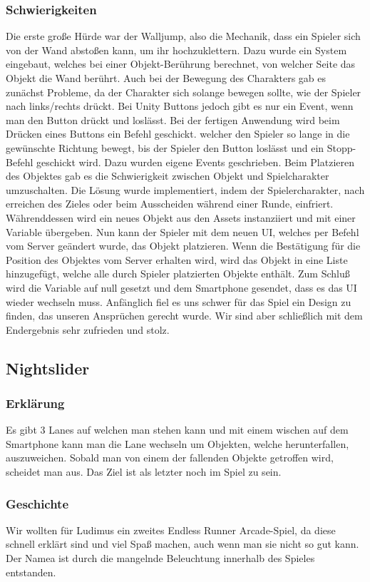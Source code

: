\subsubsection{Schwierigkeiten}
Die erste große Hürde war der Walljump, also die Mechanik, dass ein Spieler sich von der Wand abstoßen kann, um ihr hochzuklettern. Dazu wurde ein System eingebaut, welches bei einer Objekt-Berührung berechnet, von welcher Seite das Objekt die Wand berührt. Auch bei der Bewegung des Charakters gab es zunächst Probleme, da der Charakter sich solange bewegen sollte, wie der Spieler nach links/rechts drückt. Bei Unity Buttons jedoch gibt es nur ein Event, wenn man den Button drückt und loslässt. Bei der fertigen Anwendung wird beim Drücken eines Buttons ein Befehl geschickt. welcher den Spieler so lange in die gewünschte Richtung bewegt, bis der Spieler den Button loslässt und ein Stopp-Befehl geschickt wird. Dazu wurden eigene Events geschrieben. Beim Platzieren des Objektes gab es die Schwierigkeit zwischen Objekt und Spielcharakter umzuschalten. Die Lösung wurde implementiert, indem der Spielercharakter, nach erreichen des Zieles oder beim Ausscheiden während einer Runde, einfriert. Währenddessen wird ein neues Objekt aus den Assets instanziiert und mit einer Variable übergeben. Nun kann der Spieler mit dem neuen UI, welches per Befehl vom Server geändert wurde, das Objekt platzieren. Wenn die Bestätigung für die Position des Objektes vom Server erhalten wird, wird das Objekt in eine Liste hinzugefügt, welche alle durch Spieler platzierten Objekte enthält. Zum Schluß wird die Variable auf null gesetzt und dem Smartphone gesendet, dass es das UI wieder wechseln muss. Anfänglich fiel es uns schwer für das Spiel ein Design zu finden, das unseren Ansprüchen gerecht wurde. Wir sind aber schließlich mit dem Endergebnis sehr zufrieden und stolz.
\subsection{Nightslider}
\subsubsection{Erklärung}
Es gibt 3 Lanes auf welchen man stehen kann und mit einem wischen auf dem Smartphone kann man die Lane wechseln um Objekten, welche herunterfallen, auszuweichen. Sobald man von einem der fallenden Objekte getroffen wird, scheidet man aus. Das Ziel ist als letzter noch im Spiel zu sein.
\subsubsection{Geschichte}
Wir wollten für Ludimus ein zweites Endless Runner Arcade-Spiel, da diese schnell erklärt sind und viel Spaß machen, auch wenn man sie nicht so gut kann. Der Namea ist durch die mangelnde Beleuchtung innerhalb des Spieles entstanden.
